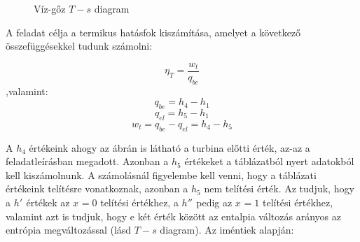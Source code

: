 \begin{figure}[h]
	\centering
	\label{figure:guh7ud-vgtsd}
	\caption{Víz-gőz $T-s$ diagram}
\end{figure}
\pagebreak

\noindent A feladat célja a termikus hatásfok kiszámítása, amelyet a következő összefüggésekkel tudunk számolni:

\begin{equation*}
\eta_{T}= \dfrac{w_{t}}{q_{be}}
\end{equation*}
\noindent ,valamint:
\begin{equation*}
q_{be}= h_{4}-h_{1}
\end{equation*}
\begin{equation*}
q_{el}= h_{5}-h_{1}
\end{equation*}
\begin{equation*}
w_{t}= q_{be}-q_{el}=h_{4}-h_{5}
\end{equation*}


\noindent A $h_{4}$ értékeink ahogy az ábrán is látható a turbina előtti érték, az-az a feladatleírásban megadott. Azonban a $h_{5}$ értékeket a táblázatból nyert adatokból kell kiszámolnunk. A számolásnál figyelembe kell venni, hogy a táblázati értékeink telítésre vonatkoznak, azonban a $h_{5}$ nem telítési érték. Az tudjuk, hogy a $h'_{}$ értékek az $x_{}=0$ telítési értékhez, a $h''_{}$ pedig az $x_{}=1$ telítési értékhez, valamint azt is tudjuk, hogy e két érték között az entalpia változás arányos az entrópia megváltozással (lásd $T-s$ diagram). Az iméntiek alapján:


